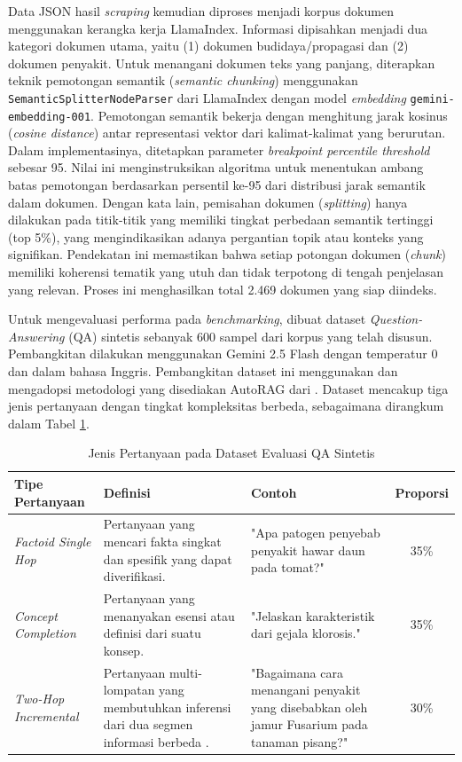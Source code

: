 Data JSON hasil \textit{scraping} kemudian diproses menjadi korpus dokumen menggunakan kerangka kerja LlamaIndex. Informasi dipisahkan menjadi dua kategori dokumen utama, yaitu (1) dokumen budidaya/propagasi dan (2) dokumen penyakit. Untuk menangani dokumen teks yang panjang, diterapkan teknik pemotongan semantik (\textit{semantic chunking}) menggunakan \texttt{SemanticSplitterNodeParser} dari LlamaIndex dengan model \textit{embedding} \texttt{gemini-embedding-001}. Pemotongan semantik bekerja dengan menghitung jarak kosinus (\textit{cosine distance}) antar representasi vektor dari kalimat-kalimat yang berurutan. Dalam implementasinya, ditetapkan parameter \textit{breakpoint percentile threshold} sebesar 95. Nilai ini menginstruksikan algoritma untuk menentukan ambang batas pemotongan berdasarkan persentil ke-95 dari distribusi jarak semantik dalam dokumen. Dengan kata lain, pemisahan dokumen (\textit{splitting}) hanya dilakukan pada titik-titik yang memiliki tingkat perbedaan semantik tertinggi (top 5\%), yang mengindikasikan adanya pergantian topik atau konteks yang signifikan. Pendekatan ini memastikan bahwa setiap potongan dokumen (\textit{chunk}) memiliki koherensi tematik yang utuh dan tidak terpotong di tengah penjelasan yang relevan. Proses ini menghasilkan total 2.469 dokumen yang siap diindeks.

Untuk mengevaluasi performa pada \textit{benchmarking}, dibuat dataset \textit{Question-Answering} (QA) sintetis sebanyak 600 sampel dari korpus yang telah disusun. Pembangkitan dilakukan menggunakan Gemini 2.5 Flash dengan temperatur 0 dan dalam bahasa Inggris. Pembangkitan dataset ini menggunakan dan mengadopsi metodologi yang disediakan AutoRAG dari \textcite{kimAutoRAGAutomatedFramework2024}. Dataset mencakup tiga jenis pertanyaan dengan tingkat kompleksitas berbeda, sebagaimana dirangkum dalam Tabel \ref{tab:qa_types}.

\begin{table}[H]
    \centering
    \caption{Jenis Pertanyaan pada Dataset Evaluasi QA Sintetis}
    \label{tab:qa_types}
    \small
    \begin{tabular}{|l|p{4cm}|p{6cm}|c|}
    \hline
    \textbf{Tipe Pertanyaan} & \textbf{Definisi} & \textbf{Contoh} & \textbf{Proporsi} \\ \hline
    \textit{Factoid Single Hop} & Pertanyaan yang mencari fakta singkat dan spesifik yang dapat diverifikasi. & "Apa patogen penyebab penyakit hawar daun pada tomat?" & 35\% \\ \hline
    \textit{Concept Completion} & Pertanyaan yang menanyakan esensi atau definisi dari suatu konsep. & "Jelaskan karakteristik dari gejala klorosis." & 35\% \\ \hline
    \textit{Two-Hop Incremental} & Pertanyaan multi-lompatan yang membutuhkan inferensi dari dua segmen informasi berbeda \parencite{hwangExplainableMultihopQuestion2024}. & "Bagaimana cara menangani penyakit yang disebabkan oleh jamur Fusarium pada tanaman pisang?" & 30\% \\ \hline
    \end{tabular}
\end{table}

